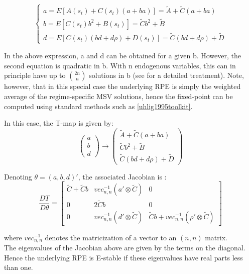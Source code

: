 \documentclass[12pt,reqno]{article}
\numberwithin{equation}{section}
\begin{document}
$$
\begin{cases}
a = E[ A(s_t) + C(s_t)  (a+ba)]= \tilde{A} + \tilde{C} (a+ba) \\
b=E[C(s_t) b^2 + B(s_t)]=\tilde{C} b^2 + \tilde{B} \\
d = E[C(s_t) (bd+d \rho) + D(s_t)] = \tilde{C} (bd + d \rho ) + \tilde{D} 
\end{cases}
$$

In the above expression, a and d can be obtained for a given b. However, the second equation is quadratic in b. With n endogenous variables, this can in principle have up to $ {2n}\choose{n} $ solutions in b (see \cite{evans2012learning} for a detailed treatment). Note, however, that in this special case the underlying RPE is simply the weighted average of the regime-specific MSV solutions, hence the fixed-point can be computed using standard methods such as \ref{uhlig1995toolkit}. 

In this case, the T-map is given by: \\

$$
\begin{pmatrix} a \\ b \\ d \end{pmatrix} \rightarrow \begin{pmatrix} \tilde{A} + \tilde{C} (a+ba) \\ \tilde{C} b^2 + \tilde{B} \\  \tilde{C} (bd+d \rho) + \tilde{D} \end{pmatrix}
$$

Denoting $\theta = (a,b,d)' $, the associated Jacobian is : \\

$$ \frac{ D T } { D\theta }  = \begin{bmatrix} \tilde{C} + \tilde{C} b & vec_{n,n}^{-1} (a' \otimes \tilde{C}) & 0 \\
0 & 2 \tilde{C} b & 0 \\
0 & vec_{n,n}^{-1}(d' \otimes \tilde{C} ) & \tilde{C} b + vec_{n,n}^{-1} (\rho' \otimes \tilde{C} ) \end{bmatrix} $$

where $ vec_{n,n}^{-1} $ denotes the matricization of a vector to an $(n,n) $ matrix. \\

The eigenvalues of the Jacobian above are given by the terms on the diagonal. Hence the underlying RPE is E-stable if these eigenvalues have real parts less than one. \\
\end{document}
